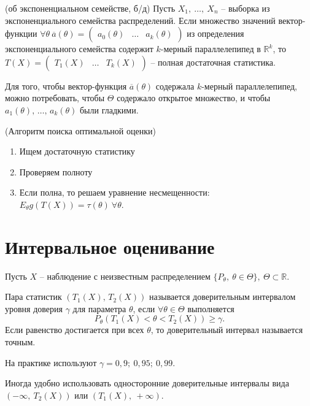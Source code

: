 \begin{theorem}
    (об экспоненциальном семействе, б/д) Пусть $\displaystyle X_{1} ,\ \dotsc ,\ X_{n}$ -- выборка из экспоненциального семейства распределений. Если множество значений вектор-функции $\displaystyle \forall \theta \ \overline{a}( \theta ) =\begin{pmatrix}
    a_{0}( \theta ) & \dotsc  & a_{k}( \theta )
    \end{pmatrix}$ из определения экспоненциального семейства содержит $\displaystyle k$-мерный параллелепипед в $\displaystyle \mathbb{R}^{k}$, то $\displaystyle T( X) =\begin{pmatrix}
    T_{1}( X) & \dotsc  & T_{k}( X)
    \end{pmatrix}$ -- полная достаточная статистика.
\end{theorem}
\begin{note}
    Для того, чтобы вектор-функция $\overline{a}(\theta)$ содержала $k$-мерный параллелепипед, можно потребовать, чтобы $\Theta$ содержало открытое множество, и чтобы $a_1(\theta),\, \ldots,\, a_k(\theta)$ были гладкими.
\end{note}

\begin{proposition}
    (Алгоритм поиска оптимальной оценки)
    \begin{enumerate}
    \item Ищем достаточную статистику
    \item Проверяем полноту
    \item Если полна, то решаем уравнение несмещенности: $\displaystyle E_{\theta } g( T( X)) =\tau ( \theta ) \ \forall \theta $.
    \end{enumerate}
\end{proposition}

\section{Интервальное оценивание}

Пусть $\displaystyle X$ -- наблюдение с неизвестным распределением $\displaystyle \{P_{\theta } ,\ \theta \in \Theta \} ,\ \Theta \subset \mathbb{R}$. 

\begin{definition}
    Пара статистик $\displaystyle ( T_{1}( X),\,T_{2}( X))$ называется доверительным интервалом уровня доверия $\displaystyle \gamma $ для параметра $\displaystyle \theta $, если $\displaystyle \forall \theta \in \Theta $ выполняется
\begin{equation*}
    P_\theta( T_{1}( X) < \theta < T_{2}( X)) \geqslant \gamma .
\end{equation*}
Если равенство достигается при всех $\displaystyle \theta $, то доверительный интервал называется точным.
\end{definition}
\begin{note}
    На практике используют $\displaystyle \gamma =0,9;\ 0,95;\ 0,99$.
\end{note}
Иногда удобно использовать односторонние доверительные интервалы вида $\displaystyle ( -\infty ,\ T_{2}( X))$ или $\displaystyle ( T_{1}( X) ,\ +\infty )$.

